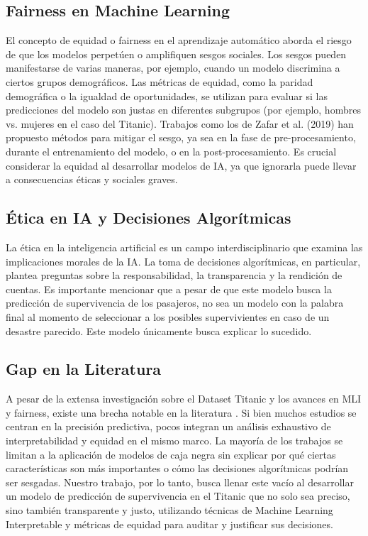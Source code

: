 \documentclass[conference]{IEEEtran}
\begin{document}
\subsection{Fairness en Machine Learning}
El concepto de equidad o fairness en el aprendizaje automático aborda el riesgo de que los modelos perpetúen o amplifiquen sesgos sociales. Los sesgos pueden manifestarse de varias maneras, por ejemplo, cuando un modelo discrimina a ciertos grupos demográficos. Las métricas de equidad, como la paridad demográfica o la igualdad de oportunidades, se utilizan para evaluar si las predicciones del modelo son justas en diferentes subgrupos (por ejemplo, hombres vs. mujeres en el caso del Titanic). Trabajos como los de Zafar et al. (2019) han propuesto métodos para mitigar el sesgo, ya sea en la fase de pre-procesamiento, durante el entrenamiento del modelo, o en la post-procesamiento. Es crucial considerar la equidad al desarrollar modelos de IA, ya que ignorarla puede llevar a consecuencias éticas y sociales graves.

\subsection{Ética en IA y Decisiones Algorítmicas}
La ética en la inteligencia artificial es un campo interdisciplinario que examina las implicaciones morales de la IA. La toma de decisiones algorítmicas, en particular, plantea preguntas sobre la responsabilidad, la transparencia y la rendición de cuentas. Es importante mencionar que a pesar de que este modelo busca la predicción de supervivencia de los pasajeros, no sea un modelo con la palabra final al momento de seleccionar a los posibles supervivientes en caso de un desastre parecido. Este modelo únicamente busca explicar lo sucedido.

\subsection{Gap en la Literatura}
A pesar de la extensa investigación sobre el Dataset Titanic y los avances en MLI y fairness, existe una brecha notable en la literatura . Si bien muchos estudios se centran en la precisión predictiva, pocos integran un análisis exhaustivo de interpretabilidad y equidad en el mismo marco. La mayoría de los trabajos se limitan a la aplicación de modelos de caja negra sin explicar por qué ciertas características son más importantes o cómo las decisiones algorítmicas podrían ser sesgadas. Nuestro trabajo, por lo tanto, busca llenar este vacío al desarrollar un modelo de predicción de supervivencia en el Titanic que no solo sea preciso, sino también transparente y justo, utilizando técnicas de Machine Learning Interpretable y métricas de equidad para auditar y justificar sus decisiones.
\end{document}
